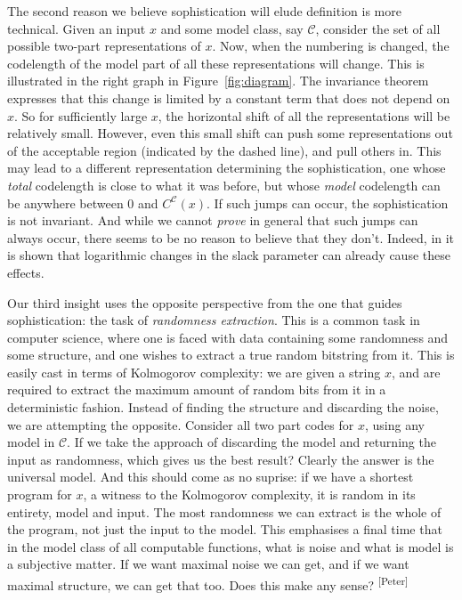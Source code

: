 \documentclass{style/llncs}
\newcommand{\C}{\mathscr C}
\newcommand{\pb}[1]{\textcolor{OliveGreen}{\small #1 \textsuperscript{[Peter]} }}
\begin{document}
The second reason we believe sophistication will elude definition is more technical. Given an input $x$ and some model class, say $\C$, consider the set of all possible two-part representations of $x$. Now, when the numbering is changed, the codelength of the model part of all these representations will change. This is illustrated in the right graph in Figure~\ref{fig:diagram}. The invariance theorem expresses that this change is limited by a constant term that does not depend on $x$. So for sufficiently large $x$, the horizontal shift of all the representations will be relatively small. However, even this small shift can push some representations out of the acceptable region (indicated by the dashed line), and pull others in. This may lead to a different representation determining the sophistication, one whose \emph{total} codelength is close to what it was before, but whose \emph{model} codelength can be anywhere between $0$ and $C^\C(x)$. If such jumps can occur, the sophistication is not invariant. And while we cannot \emph{prove} in general that such jumps can always occur, there seems to be no reason to believe that they don't. Indeed, in \cite{antunes2013sophistication} it is shown that logarithmic changes in the slack parameter can already cause these effects.

Our third insight uses the opposite perspective from the one that guides sophistication: the task of \emph{randomness extraction}. This is a common task in computer science, where one is faced with data containing some randomness and some structure, and one wishes to extract a true random bitstring from it.  This is easily cast in terms of Kolmogorov complexity: we are given a string $x$, and are required to extract the maximum amount of random bits from it in a deterministic fashion. Instead of finding the structure and discarding the noise, we are attempting the opposite. Consider all two part codes for $x$, using any model in $\C$. If we take the approach of discarding the model and returning the input as randomness, which gives us the best result? Clearly the answer is the universal model. And this should come as no suprise: if we have a shortest program for $x$, a witness to the Kolmogorov complexity, it is random in its entirety, model and input. The most randomness we can extract is the whole of the program, not just the input to the model. This emphasises a final time that in the model class of all computable functions, what is noise and what is model is a subjective matter. If we want maximal noise we can get, and if we want maximal structure, we can get that too. \pb{Does this make any sense?}
\end{document}
